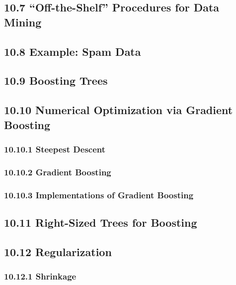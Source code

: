 \documentclass[11pt]{article}
\begin{document}
\subsection{10.7 ``Off-the-Shelf'' Procedures for Data
Mining}\label{off-the-shelf-procedures-for-data-mining}

\subsection{10.8 Example: Spam Data}\label{example-spam-data}

\subsection{10.9 Boosting Trees}\label{boosting-trees}

\subsection{10.10 Numerical Optimization via Gradient
Boosting}\label{numerical-optimization-via-gradient-boosting}

\subsubsection{10.10.1 Steepest Descent}\label{steepest-descent}

\subsubsection{10.10.2 Gradient Boosting}\label{gradient-boosting}

\subsubsection{10.10.3 Implementations of Gradient
Boosting}\label{implementations-of-gradient-boosting}

\subsection{10.11 Right-Sized Trees for
Boosting}\label{right-sized-trees-for-boosting}

\subsection{10.12 Regularization}\label{regularization}

\subsubsection{10.12.1 Shrinkage}\label{shrinkage}
\end{document}
